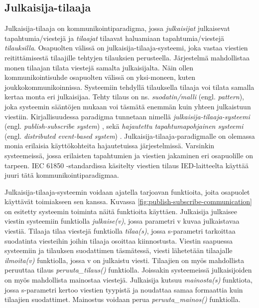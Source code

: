 \subsection{Julkaisija-tilaaja}
\label{ch:julkaisija-tilaaja-paradigma}
Julkaisija-tilaaja on kommunikointiparadigma, jossa \emph{julkaisijat} julkaisevat tapahtumia/viestejä ja \emph{tilaajat} tilaavat haluamiaan tapahtumia/viestejä \emph{tilauksilla}. Osapuolten välissä on julkaisija-tilaaja-systeemi, joka vastaa viestien reitittämisestä tilaajille tehtyjen tilauksien perusteella. Järjestelmä mahdollistaa monen tilaajan tilata viestejä samalta julkaisijalta. Näin ollen kommunikointisuhde osapuolten välissä on yksi-moneen, kuten joukkokommunikoinnissa. Systeemiin tehdyllä tilauksella tilaaja voi tilata samalla kertaa monta eri julkaisijaa. Tehty tilaus on ns. \emph{suodatin/malli} (engl. \emph{pattern}), joka systeemin sääntöjen mukaan voi täsmätä enemmän kuin yhteen julkaistuun viestiin. Kirjallisuudessa paradigma tunnetaan nimellä \emph{julkaisija-tilaaja-systeemi} (engl. \emph{publish-subscribe system}) \cite{baldoni2005distributed}, sekä \emph{hajautettu tapahtumapohjainen systeemi} (engl. \emph{distributed event-based system}) \cite{distributed-event-based-systems}. Julkaisija-tilaaja-paradigmalle on olemassa monia erilaisia käyttökohteita hajautetuissa järjestelmissä. Varsinkin systeemeissä, jossa erilaisten tapahtumien ja viestien jakaminen eri osapuolille on tarpeen. IEC 61850 -standardissa käsitelty viestien tilaus IED-laitteelta käyttää juuri tätä kommunikointiparadigmaa.

Julkaisija-tilaaja-systeemin voidaan ajatella tarjoavan funktioita, joita osapuolet käyttävät toimiakseen sen kanssa. Kuvassa \ref{fig:publish-subscribe-communication} on esitetty systeemin toiminta näitä funktioita käyttäen. Julkaisija julkaisee viestin systeemiin funktiolla \emph{julkaise(v)}, jossa parametri v kuvaa julkaistavaa viestiä. Tilaaja tilaa viestejä funktiolla \emph{tilaa(s)}, jossa s-parametri tarkoittaa suodatinta viesteihin joihin tilaaja osoittaa kiinnostusta. Viestin saapuessa systeemiin ja tilauksen suodattimen täsmätessä, viesti lähetetään tilaajalle \emph{ilmoita(v)} funktiolla, jossa v on julkaistu viesti. Tilaajien on myös mahdollista peruuttaa tilaus \emph{peruuta\_tilaus()} funktiolla. Joissakin systeemeissä julkaisijoiden on myös mahdollista mainostaa viestejä. Julkaisija kutsuu \emph{mainosta(s)} funktiota, jossa s-parametri kertoo viestien tyypistä ja noudattaa samaa formaattia kuin tilaajien suodattimet. Mainostus voidaan perua \emph{peruuta\_mainos()} funktiolla. \mbox{\cite[s.~2--3]{baldoni2005distributed}} \mbox{\cite[s.~26--28]{distributed-event-based-systems}}

